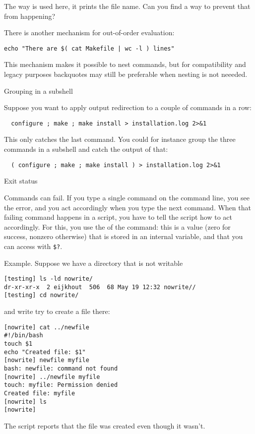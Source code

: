 \begin{exercise}
  The way  is used here, it prints the
  file name. Can you find a way to prevent that from happening?
\end{exercise}

There is another mechanism for
out-of-order evaluation:
\begin{lstlisting}
echo "There are $( cat Makefile | wc -l ) lines"
\end{lstlisting}
This mechanism makes it possible to nest commands,
but for compatibility and legacy purposes backquotes
may still be preferable when nesting is not neeeded.

 {Grouping in a subshell}

Suppose you want to apply output redirection to a couple of commands
in a row:
\begin{lstlisting}
  configure ; make ; make install > installation.log 2>&1
\end{lstlisting}
This only catches the last command. You could for instance group the
three commands in a subshell and catch the output of that:
\begin{lstlisting}
  ( configure ; make ; make install ) > installation.log 2>&1
\end{lstlisting}

 {Exit status}

Commands can fail. If you type a single command on the command line,
you see the error, and you act accordingly when you type the next
command. When that failing command happens in a script, you have to
tell the script how to act accordingly. For this, you use the
 of the command: this is a value (zero for
success, nonzero otherwise) that is stored in an internal variable,
and that you can access with \verb+$?+.

Example. Suppose we have a directory that is not writable
\begin{lstlisting}
[testing] ls -ld nowrite/
dr-xr-xr-x  2 eijkhout  506  68 May 19 12:32 nowrite//
[testing] cd nowrite/
\end{lstlisting}
and write try to create a file there:
\begin{lstlisting}
[nowrite] cat ../newfile 
#!/bin/bash
touch $1
echo "Created file: $1"
[nowrite] newfile myfile
bash: newfile: command not found
[nowrite] ../newfile myfile
touch: myfile: Permission denied
Created file: myfile
[nowrite] ls
[nowrite]
\end{lstlisting}
The script reports that the file was created even though it wasn't.

